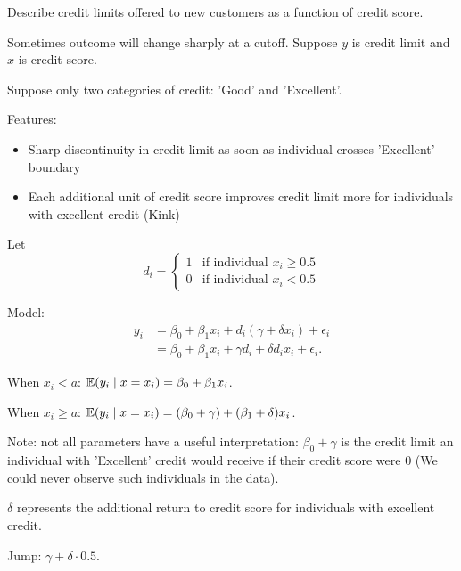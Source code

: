 \begin{remark}
	Describe credit limits offered to new customers as a function of credit score.
	
	Sometimes outcome will change sharply at a cutoff. Suppose $y$ is credit limit and $x$ is credit score.
	
	Suppose only two categories of credit: 'Good' and 'Excellent'.
	
	Features:
	\begin{itemize}
		\item Sharp discontinuity in credit limit as soon as individual crosses 'Excellent' boundary
		\item Each additional unit of credit score improves credit limit more for individuals with excellent credit (Kink)
	\end{itemize}
	
	Let \[
		d_i = \begin{cases}
			1 & \text{if individual } x_i \ge 0.5 \\
			0 & \text{if individual } x_i < 0.5
		\end{cases}
	\] 
	
	Model: \begin{align*}
		y_i &= \beta_0 + \beta_1 x_i + d_i(\gamma + \delta x_i) + \epsilon_i \\
		&= \beta_0 + \beta_1 x_i + \gamma d_i + \delta d_i x_i + \epsilon_i
	.\end{align*}
	
	When $x_i < a$: $\mathbb{E}(y_i \mid x = x_i) = \beta_0 + \beta_1 x_i$.
	
	When $x_i \ge a$: $\mathbb{E}(y_i \mid x = x_i) = (\beta_0 + \gamma) + (\beta_1 + \delta) x_i$.
	
	Note: not all parameters have a useful interpretation: $\beta_0 + \gamma$ is the credit limit an individual with 'Excellent' credit would receive if their credit score were $0$ (We could never observe such individuals in the data).
	
	$\delta$ represents the additional return to credit score for individuals with excellent credit.
	
	Jump: $\gamma + \delta \cdot 0.5$.
\end{remark}

